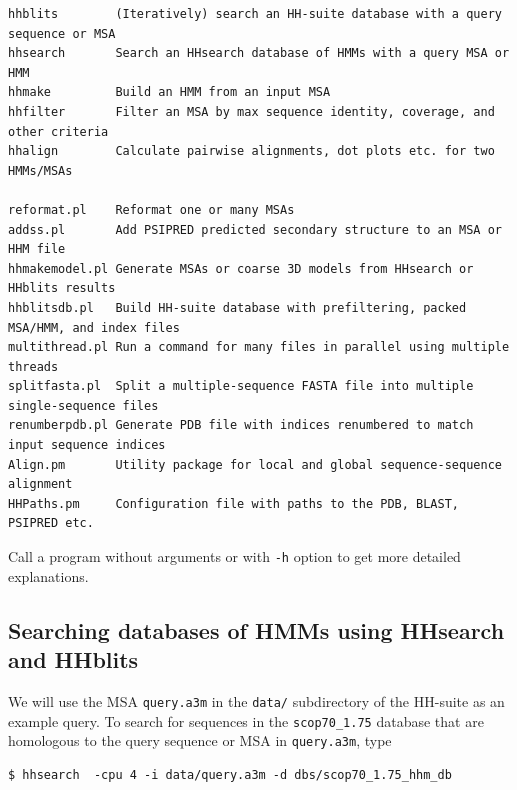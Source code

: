 \documentclass[11pt,a4paper]{article}
\begin{document}
\small 
\begin{verbatim}
hhblits        (Iteratively) search an HH-suite database with a query sequence or MSA
hhsearch       Search an HHsearch database of HMMs with a query MSA or HMM
hhmake         Build an HMM from an input MSA 
hhfilter       Filter an MSA by max sequence identity, coverage, and other criteria
hhalign        Calculate pairwise alignments, dot plots etc. for two HMMs/MSAs

reformat.pl    Reformat one or many MSAs
addss.pl       Add PSIPRED predicted secondary structure to an MSA or HHM file
hhmakemodel.pl Generate MSAs or coarse 3D models from HHsearch or HHblits results	
hhblitsdb.pl   Build HH-suite database with prefiltering, packed MSA/HMM, and index files
multithread.pl Run a command for many files in parallel using multiple threads
splitfasta.pl  Split a multiple-sequence FASTA file into multiple single-sequence files
renumberpdb.pl Generate PDB file with indices renumbered to match input sequence indices
Align.pm       Utility package for local and global sequence-sequence alignment
HHPaths.pm     Configuration file with paths to the PDB, BLAST, PSIPRED etc.
\end{verbatim} 
\normalsize

Call a program without arguments or with \verb`-h` option to get more detailed explanations.


\subsection{Searching databases of HMMs using HHsearch and HHblits}\label{searching_hm_dbs}

We will use the MSA \verb`query.a3m` in the \verb`data/` subdirectory of the HH-suite as an example query. To search for sequences in the \verb`scop70_1.75` database that are homologous to the query sequence or MSA in \verb`query.a3m`, type

\begin{verbatim}
$ hhsearch  -cpu 4 -i data/query.a3m -d dbs/scop70_1.75_hhm_db
\end{verbatim}
\end{document}
